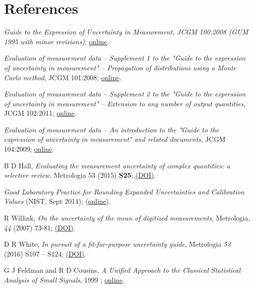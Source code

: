 \section{References}

\begingroup
\renewcommand{\section}[2]{}%

\begin{thebibliography}{99}
 \textit{Guide to the Expression of Uncertainty in Measurement, JCGM 100:2008 (GUM 1995 with minor revisions)}; \href{http://www.bipm.org/utils/common/documents/jcgm/JCGM_100_2008_E.pdf}{online}.

 \textit{Evaluation of measurement data – Supplement 1 to the "Guide to the expression of uncertainty in measurement" – Propagation of distributions using a Monte Carlo method}, JCGM 101:2008; \href{http://www.bipm.org/utils/common/documents/jcgm/JCGM_101_2008_E.pdf}{online}.
 
 \textit{Evaluation of measurement data – Supplement 2 to the "Guide to the expression of uncertainty in measurement" – Extension to any number of output quantities}, JCGM 102:2011; \href{http://www.bipm.org/utils/common/documents/jcgm/JCGM_102_2011_E.pdf}{online}.

 \textit{Evaluation of measurement data – An introduction to the "Guide to the expression of uncertainty in measurement" and related documents}, JCGM 104:2009; \href{http://www.bipm.org/utils/common/documents/jcgm/JCGM_104_2009_E.pdf}{online}.

B D Hall, \textit{Evaluating the measurement uncertainty of complex quantities: a selective review}, Metrologia 53 (2015) \textbf{S25}; \href{http://dx.doi.org/10.1088/0026-1394/53/1/S25}{(DOI)}.

\textit{Good Laboratory Practice for Rounding Expanded Uncertainties and Calibration Values} (NIST, Sept 2014); (\href{http://www.nist.gov/pml/wmd/labmetrology/upload/GLP_9_20140911.pdf}{online}). 

R Willink, \textit{On the uncertainty of the mean of digitized measurements}, Metrologia, \textit{44} (2007) 73-81; \href{http://dx.doi.org/10.1088/0026-1394/44/1/011}{(DOI)}.

D R White, \textit{In pursuit of a fit-for-purpose uncertainty guide}, Metrologia \textit{53} (2016) S107 – S124; \href{http://dx.doi.org/10.1088/0026-1394/53/4/S107}{(DOI)}.

G J Feldman and R D Cousins, \textit{A Unified Approach to the Classical Statistical Analysis of Small Signals}, 1999 ; \href{http://arxiv.org/abs/physics/9711021/}{online}.

\end{thebibliography}
\endgroup